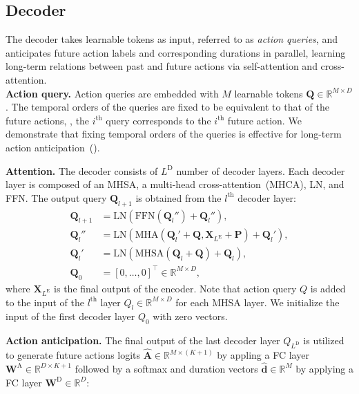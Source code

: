 \subsection{Decoder}
\label{sec:4.2}
The decoder takes learnable tokens as input, referred to as \textit{action queries}, and anticipates future action labels and corresponding durations in parallel, learning long-term relations between past and future actions via self-attention and cross-attention. 
\noindent
\\
\textbf{Action query.}
Action queries are embedded with $M$ learnable tokens $\bm{Q} \in \mathbb{R}^{M \times D}$.
The temporal orders of the queries are fixed to be equivalent to that of the future actions, \ie, the $i^{\textrm{th}}$ query corresponds to the $i^{\textrm{th}}$ future action.
We demonstrate that fixing temporal orders of the queries is effective for long-term action anticipation~().

\noindent
\textbf{Attention.}
The decoder consists of $L^\mathrm{D}$ number of decoder layers. Each decoder layer is composed of an MHSA, a multi-head cross-attention~(MHCA), LN, and FFN. 
The output query $\bm{Q}_{l+1}$ is obtained from the $l^{\textrm{th}}$ decoder layer:
\vspace{-1mm}
\begin{align}
    {\bm{Q}}_{l+1} &= \mathrm{LN}(\mathrm{FFN}({\bm{Q}}_l'') + {\bm{Q}}_l''),
    \\
    {\bm{Q}}_l'' &= \mathrm{LN}(\mathrm{MHA}(\bm{Q}_l'+\bm{Q},\bm{X}_{L^\mathrm{E}}+\bm{P}) + {\bm{Q}}_l'),
    \\
    {\bm{Q}}_l' &= \mathrm{LN}(\mathrm{MHSA}(\bm{Q}_{l}+\bm{Q})+{\bm{Q}}_l),
    \\
    \bm{Q}_0 &= [0, \dots, 0]^\top \in \mathbb{R}^{M\times D},
\end{align}
where $\bm{X}_{L^\mathrm{E}}$ is the final output of the encoder.
Note that action query $Q$ is added to the input of the $l^{\mathrm{th}}$ layer $Q_l\in\mathbb{R}^{M\times D}$ for each MHSA layer.
We initialize the input of the first decoder layer $Q_0$ with zero vectors.

\noindent
\textbf{Action anticipation.} 
The final output of the last decoder layer $Q_{L^{\mathrm{D}}}$ is utilized to generate future actions logits $\hat{\bm{A}} \in \mathbb{R}^{M \times (K+1)}$ by appling a FC layer $\bm{W}^{\mathrm{A}}\in \mathbb{R}^{D \times K+1}$ followed by a softmax and duration vectors $\hat{\bm{d}} \in \mathbb{R}^{M}$ by applying a FC layer $\bm{W}^\mathrm{D}\in \mathbb{R}^{D}$:

